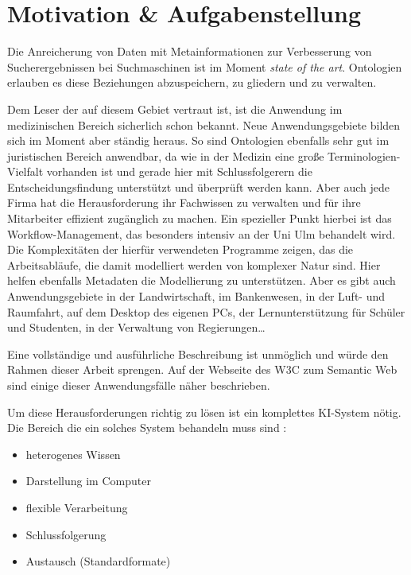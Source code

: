 \chapter{Motivation \& Aufgabenstellung}
\label{kapitel-motivation}

Die Anreicherung von Daten mit Metainformationen zur Verbesserung von Sucherergebnissen bei Suchmaschinen ist im Moment \emph{state of the art}. Ontologien erlauben es diese Beziehungen abzuspeichern, zu gliedern und zu verwalten.

Dem Leser der auf diesem Gebiet vertraut ist, ist die Anwendung im medizinischen Bereich sicherlich schon bekannt. Neue Anwendungsgebiete bilden sich im Moment aber ständig heraus. So sind Ontologien ebenfalls sehr gut im juristischen Bereich anwendbar, da wie in der Medizin eine große Terminologien-Vielfalt vorhanden ist und gerade hier mit Schlussfolgerern die Entscheidungsfindung unterstützt und überprüft werden kann.
Aber auch jede Firma hat die Herausforderung ihr Fachwissen zu verwalten und für ihre Mitarbeiter effizient zugänglich zu machen. Ein spezieller Punkt hierbei ist das Workflow-Management, das besonders intensiv an der Uni Ulm behandelt wird. Die Komplexitäten der hierfür verwendeten Programme zeigen, das die Arbeitsabläufe, die damit modelliert werden von komplexer Natur sind. Hier helfen ebenfalls Metadaten die Modellierung zu unterstützen.
Aber es gibt auch Anwendungsgebiete in der Landwirtschaft, im Bankenwesen, in der Luft- und Raumfahrt, auf dem Desktop des eigenen PCs, der Lernunterstützung für Schüler und Studenten, in der Verwaltung von Regierungen\ldots

Eine vollständige und ausführliche Beschreibung ist unmöglich und würde den Rahmen dieser Arbeit sprengen. Auf der Webseite des W3C zum Semantic Web \cite{W3CUseCases} sind einige dieser Anwendungsfälle näher beschrieben.

Um diese Herausforderungen richtig zu lösen ist ein komplettes KI-System nötig. Die Bereich die ein solches System behandeln muss sind \cite{vonHenke2009}:

\begin{itemize}
  \item heterogenes Wissen
  \item Darstellung im Computer
  \item flexible Verarbeitung
  \item Schlussfolgerung
  \item Austausch (Standardformate)
\end{itemize}

